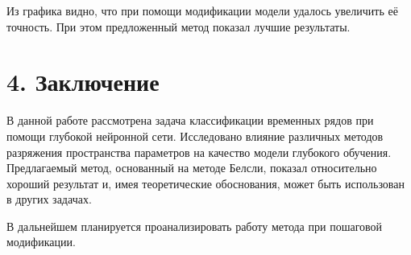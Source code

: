 \documentclass[12pt]{article}
\begin{document}
Из графика видно, что при помощи модификации модели удалось увеличить её точность. При этом предложенный метод показал лучшие результаты.

\section{4. Заключение}
В данной работе рассмотрена задача классификации временных рядов при помощи глубокой нейронной сети. Исследовано влияние различных методов разряжения пространства параметров на качество модели глубокого обучения. Предлагаемый метод, основанный на методе Белсли, показал относительно хороший результат и, имея теоретические обоснования, может быть использован в других задачах.

В дальнейшем планируется проанализировать работу метода при пошаговой модификации.
\end{document}
